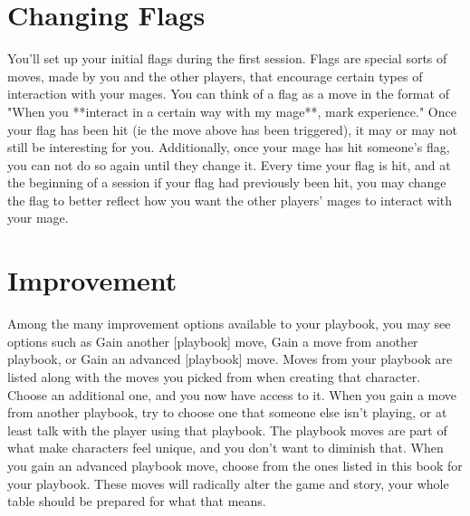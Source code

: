 \documentclass[
  oneside,
  statementpaper,
  9pt]{memoir}
\begin{document}
\hypertarget{changing-flags}{%
\section{Changing Flags}\label{changing-flags}}

\begin{Player}

You’ll set up your initial flags during the first session. Flags are special sorts of moves, made by you and the other players, that encourage certain types of interaction with your mages. You can think of a flag as a move in the format of "When you **interact in a certain way with my mage**, mark experience." Once your flag has been hit (ie the move above has been triggered), it may or may not still be interesting for you. Additionally, once your mage has hit someone’s flag, you can not do so again until they change it. Every time your flag is hit, and at the beginning of a session if your flag had previously been hit, you may change the flag to better reflect how you want the other players’ mages to interact with your mage.

\end{Player}

\hypertarget{improvement}{%
\section{Improvement}\label{improvement}}

\begin{Player}

Among the many improvement options available to your playbook, you may see options such as Gain another [playbook] move, Gain a move from another playbook, or Gain an advanced [playbook] move. Moves from your playbook are listed along with the moves you picked from when creating that character. Choose an additional one, and you now have access to it. When you gain a move from another playbook, try to choose one that someone else isn’t playing, or at least talk with the player using that playbook. The playbook moves are part of what make characters feel unique, and you don’t want to diminish that. When you gain an advanced playbook move, choose from the ones listed in this book for your playbook. These moves will radically alter the game and story, your whole table should be prepared for what that means.

\end{Player}

\newpage
\end{document}
